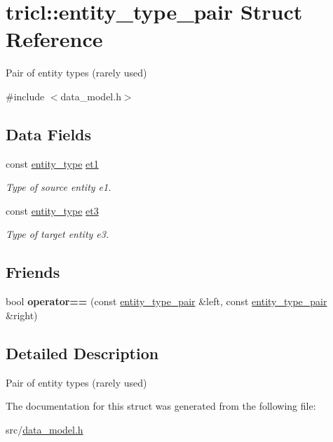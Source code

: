 \hypertarget{structtricl_1_1entity__type__pair}{}\section{tricl\+:\+:entity\+\_\+type\+\_\+pair Struct Reference}
\label{structtricl_1_1entity__type__pair}


Pair of entity types (rarely used)  




{\ttfamily \#include $<$data\+\_\+model.\+h$>$}

\subsection*{Data Fields}
\begin{DoxyCompactItemize}
\item 
\mbox{\label{structtricl_1_1entity__type__pair_a8ac4e6ba084913026bf261240ff4c062}} 
const \hyperlink{namespacetricl_afd4de3aedd5e48cf955f03457386e98f}{entity\+\_\+type} \hyperlink{structtricl_1_1entity__type__pair_a8ac4e6ba084913026bf261240ff4c062}{et1}
\begin{DoxyCompactList}\small\item\em Type of source entity e1. \end{DoxyCompactList}\item 
\mbox{\label{structtricl_1_1entity__type__pair_a677ea5a09e9a0d0dc03680d5be3afacd}} 
const \hyperlink{namespacetricl_afd4de3aedd5e48cf955f03457386e98f}{entity\+\_\+type} \hyperlink{structtricl_1_1entity__type__pair_a677ea5a09e9a0d0dc03680d5be3afacd}{et3}
\begin{DoxyCompactList}\small\item\em Type of target entity e3. \end{DoxyCompactList}\end{DoxyCompactItemize}
\subsection*{Friends}
\begin{DoxyCompactItemize}
\item 
\mbox{\label{structtricl_1_1entity__type__pair_ab148ef41047fcbd537a8f98b11e11045}} 
bool {\bfseries operator==} (const \hyperlink{structtricl_1_1entity__type__pair}{entity\+\_\+type\+\_\+pair} \&left, const \hyperlink{structtricl_1_1entity__type__pair}{entity\+\_\+type\+\_\+pair} \&right)
\end{DoxyCompactItemize}


\subsection{Detailed Description}
Pair of entity types (rarely used) 

The documentation for this struct was generated from the following file\+:\begin{DoxyCompactItemize}
\item 
src/\hyperlink{data__model_8h}{data\+\_\+model.\+h}\end{DoxyCompactItemize}
